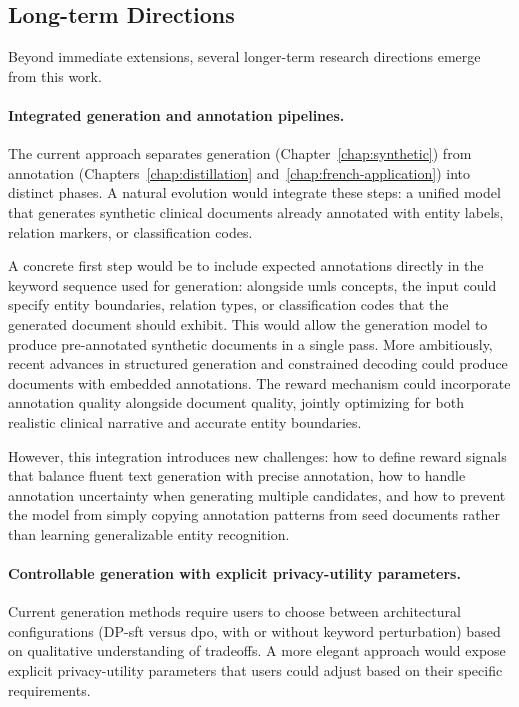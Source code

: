 \subsection{Long-term Directions}

Beyond immediate extensions, several longer-term research directions emerge from this work.

\paragraph{Integrated generation and annotation pipelines.}

The current approach separates generation (Chapter~\ref{chap:synthetic}) from annotation (Chapters~\ref{chap:distillation} and~\ref{chap:french-application}) into distinct phases.
A natural evolution would integrate these steps: a unified model that generates synthetic clinical documents already annotated with entity labels, relation markers, or classification codes.

A concrete first step would be to include expected annotations directly in the keyword sequence used for generation: alongside \gls{umls} concepts, the input could specify entity boundaries, relation types, or classification codes that the generated document should exhibit.
This would allow the generation model to produce pre-annotated synthetic documents in a single pass.
More ambitiously, recent advances in structured generation and constrained decoding could produce documents with embedded annotations.
The reward mechanism could incorporate annotation quality alongside document quality, jointly optimizing for both realistic clinical narrative and accurate entity boundaries.

However, this integration introduces new challenges: how to define reward signals that balance fluent text generation with precise annotation, how to handle annotation uncertainty when generating multiple candidates, and how to prevent the model from simply copying annotation patterns from seed documents rather than learning generalizable entity recognition.

\paragraph{Controllable generation with explicit privacy-utility parameters.}

Current generation methods require users to choose between architectural configurations (DP-\gls{sft} versus \gls{dpo}, with or without keyword perturbation) based on qualitative understanding of tradeoffs.
A more elegant approach would expose explicit privacy-utility parameters that users could adjust based on their specific requirements.

